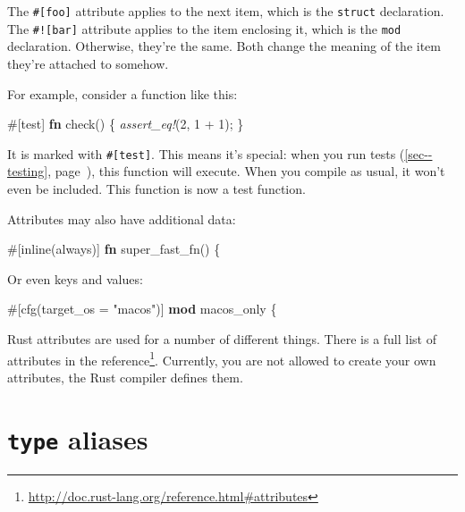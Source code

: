 \documentclass[a4paper,]{book}
\renewcommand*{\hyperref}[2][\ar]{%
  \def\ar{#2}%
  #2 (\autoref{#1}, page~\pageref{#1})}
\newenvironment{Shaded}{\begin{snugshade}}{\end{snugshade}}
\newcommand{\KeywordTok}[1]{\textcolor[rgb]{0.13,0.29,0.53}{\textbf{{#1}}}}
\newcommand{\DecValTok}[1]{\textcolor[rgb]{0.00,0.00,0.81}{{#1}}}
\newcommand{\StringTok}[1]{\textcolor[rgb]{0.31,0.60,0.02}{{#1}}}
\newcommand{\PreprocessorTok}[1]{\textcolor[rgb]{0.56,0.35,0.01}{\textit{{#1}}}}
\newcommand{\AttributeTok}[1]{\textcolor[rgb]{0.77,0.63,0.00}{{#1}}}
\newcommand{\NormalTok}[1]{{#1}}
\renewcommand{\href}[2]{#2\footnote{\url{#1}}}
\begin{document}
The \texttt{\#{[}foo{]}} attribute applies to the next item, which is
the \texttt{struct} declaration. The \texttt{\#!{[}bar{]}} attribute
applies to the item enclosing it, which is the \texttt{mod} declaration.
Otherwise, they're the same. Both change the meaning of the item they're
attached to somehow.

For example, consider a function like this:

\begin{Shaded}
\begin{Highlighting}[]
\AttributeTok{#[}\NormalTok{test}\AttributeTok{]}
\KeywordTok{fn} \NormalTok{check() \{}
    \PreprocessorTok{assert_eq!}\NormalTok{(}\DecValTok{2}\NormalTok{, }\DecValTok{1} \NormalTok{+ }\DecValTok{1}\NormalTok{);}
\NormalTok{\}}
\end{Highlighting}
\end{Shaded}

It is marked with \texttt{\#{[}test{]}}. This means it's special: when
you run \hyperref[sec--testing]{tests}, this function will execute. When
you compile as usual, it won't even be included. This function is now a
test function.

Attributes may also have additional data:

\begin{Shaded}
\begin{Highlighting}[]
\AttributeTok{#[}\NormalTok{inline}\AttributeTok{(}\NormalTok{always}\AttributeTok{)]}
\KeywordTok{fn} \NormalTok{super_fast_fn() \{}
\end{Highlighting}
\end{Shaded}

Or even keys and values:

\begin{Shaded}
\begin{Highlighting}[]
\AttributeTok{#[}\NormalTok{cfg}\AttributeTok{(}\NormalTok{target_os }\AttributeTok{=} \StringTok{"macos"}\AttributeTok{)]}
\KeywordTok{mod} \NormalTok{macos_only \{}
\end{Highlighting}
\end{Shaded}

Rust attributes are used for a number of different things. There is a
full list of attributes
\href{http://doc.rust-lang.org/reference.html\#attributes}{in the
reference}. Currently, you are not allowed to create your own
attributes, the Rust compiler defines them.

\section{\texorpdfstring{\texttt{type}
aliases}{type aliases}}\label{sec--type-aliases}
\end{document}
